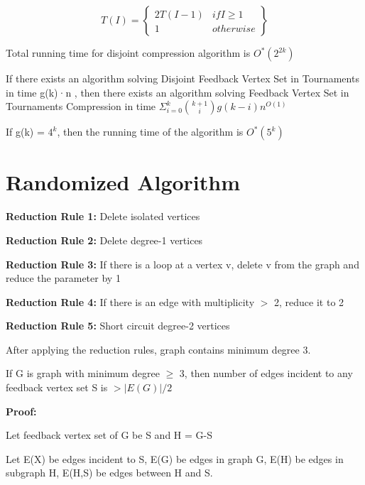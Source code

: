 \[
    T(I)=
    \left\{
    \begin{array}{lr}
       2T(I-1) & if I \geq 1 \\
      1& otherwise 
    \end{array}
    \right\} 
\]

Total running time for disjoint compression algorithm is $O^*(2^{2k})$

If there exists an algorithm solving Disjoint Feedback Vertex Set in
 Tournaments in time g(k)·n , then there exists an algorithm
solving Feedback Vertex Set in Tournaments Compression in time
$\Sigma_{i=0}^{k}   \binom{k+1}{i} g(k-i) n^{O(1)}$

If g(k) = $4^k$, then the running time of the algorithm is $O^*(5^k)$  


\section{Randomized Algorithm}
\vspace{0.6cm}


\textbf{Reduction Rule 1:} Delete isolated vertices 

\textbf{Reduction Rule 2:} Delete degree-1 vertices 

\textbf{Reduction Rule 3:} If there is a loop at a vertex v, delete v from the graph
and reduce the parameter by 1 

\textbf{Reduction Rule 4:} If there is an edge with multiplicity $>$ 2, reduce it to 2 

\textbf{Reduction Rule 5:} Short circuit degree-2 vertices 

After applying the reduction rules, graph contains minimum degree 3.

\begin{theorem}
        If G is graph with minimum degree $\geq$ 3, then number of edges
        incident to any feedback vertex set S is $> |E(G)|/2$        
\end{theorem}

\textbf{Proof:}

Let feedback vertex set of G be S and H = G-S 

Let E(X) be edges incident to S, E(G) be edges in graph G, E(H) be edges in subgraph H, 
E(H,S) be edges between H and S.

